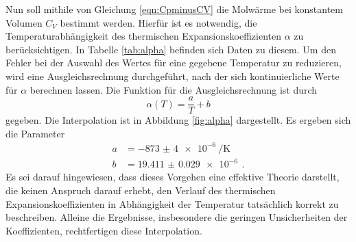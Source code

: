 Nun soll mithile von Gleichung \eqref{eqn:CpminusCV} die Molwärme bei konstantem Volumen $C_V$ bestimmt werden.
Hierfür ist es notwendig, die Temperaturabhängigkeit des thermischen Expansionskoeffizienten
$\alpha$ zu berücksichtigen. In Tabelle \ref{tab:alpha} befinden sich Daten zu diesem.
Um den Fehler bei der Auswahl des Wertes für eine gegebene Temperatur zu reduzieren, wird eine Ausgleichsrechnung durchgeführt, nach der sich kontinuierliche Werte für $\alpha$ berechnen lassen.
Die Funktion für die Ausgleichsrechnung ist durch
\begin{equation*}
  \alpha(T)=\frac{a}{T}+b
\end{equation*}
gegeben. Die Interpolation ist in Abbildung \ref{fig:alpha} dargestellt. Es ergeben sich die Parameter
\begin{align*}
  a&=\SI{-873(4)e-6}{\per\kelvin} \,\\
  b&=\SI{19.411(29)e-6}{} \,.
\end{align*}
Es sei darauf hingewiesen, dass dieses Vorgehen eine effektive Theorie darstellt, die keinen Anspruch darauf erhebt, den Verlauf des thermischen Expansionskoeffizienten in Abhängigkeit der Temperatur tatsächlich korrekt zu beschreiben. Alleine die Ergebnisse, insbesondere die geringen Unsicherheiten der Koeffizienten, rechtfertigen diese Interpolation.

